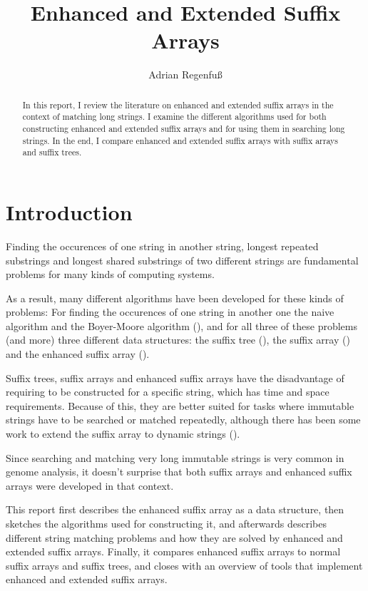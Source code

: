 \documentclass[a4paper,10pt]{article}
\title{Enhanced and Extended Suffix Arrays}
\author{Adrian Regenfuß}
\begin{document}
\maketitle

\begin{abstract}
In this report, I review the literature on enhanced and extended suffix arrays
in the context of matching long strings. I examine the different algorithms
used for both constructing enhanced and extended suffix arrays and for using
them in searching long strings.
In the end, I compare enhanced and extended suffix arrays with suffix arrays
and suffix trees.
\end{abstract}

\section*{Introduction}

Finding the occurences of one string in another string, longest repeated
substrings and longest shared substrings of two different strings are
fundamental problems for many kinds of computing systems.

As a result, many different algorithms have been developed for these kinds
of problems: For finding the occurences of one string in another one the
naive algorithm and the Boyer-Moore algorithm (\citealt{boyer1977fast}),
and for all three of these problems (and more) three different data
structures: the suffix tree (\citealt{weiner1973linear}), the suffix
array (\citealt{manber1993suffix}) and the enhanced suffix array
(\citealt{abouelhoda2002enhanced}).

Suffix trees, suffix arrays and enhanced suffix arrays have the
disadvantage of requiring to be constructed for a specific string,
which has time and space requirements. Because of this, they are better
suited for tasks where immutable strings have to be searched or matched
repeatedly, although there has been some work to extend the suffix array
to dynamic strings (\citealt{salson2010dynamic}).

Since searching and matching very long immutable strings is very common
in genome analysis, it doesn't surprise that both suffix arrays and
enhanced suffix arrays were developed in that context.

This report first describes the enhanced suffix array as a data structure,
then sketches the algorithms used for constructing it, and afterwards
describes different string matching problems and how they are solved
by enhanced and extended suffix arrays. Finally, it compares enhanced
suffix arrays to normal suffix arrays and suffix trees, and closes with
an overview of tools that implement enhanced and extended suffix arrays.
\end{document}

